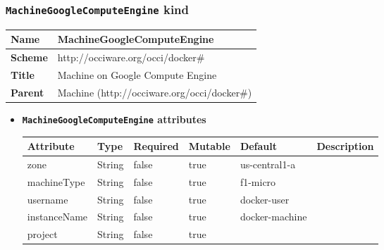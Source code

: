 \subsubsection{\texttt{MachineGoogleComputeEngine} kind}
\begin{center}
\begin{tabular}{|l|l|}
  \hline
  \textbf{Name} & MachineGoogleComputeEngine \\
  \hline  
  \textbf{Scheme} & http://occiware.org/occi/docker\# \\
  \hline
  \textbf{Title} & Machine on Google Compute Engine \\
  \hline
  \textbf{Parent} & Machine (http://occiware.org/occi/docker\#) \\
  \hline
\end{tabular}
\end{center}
\begin{itemize}
\item \textbf{\texttt{MachineGoogleComputeEngine} attributes}

\begin{tabularx}{\textwidth}{|l|l|p{1.4cm}|p{1.3cm}|l|X|}
  \hline
  \textbf{Attribute} & \textbf{Type} & \textbf{Required} & \textbf{Mutable} & \textbf{Default} & \textbf{Description} \\
  \hline  
  zone & String & false & true & us-central1-a &  \\
  \hline
  machineType & String & false & true & f1-micro &  \\
  \hline
  username & String & false & true & docker-user &  \\
  \hline
  instanceName & String & false & true & docker-machine &  \\
  \hline
  project & String & false & true &  &  \\
  \hline
\end{tabularx}
\end{itemize}



